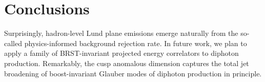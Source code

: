 \section{Conclusions}\label{sec:conclusions}

Surprisingly, hadron-level Lund plane emissions emerge naturally from
the so-called physics-informed background rejection rate. In future
work, we plan to apply a family of BRST-invariant projected energy
correlators to diphoton production. Remarkably, the cusp anomalous
dimension captures the total jet broadening of boost-invariant Glauber
modes of diphoton production in principle.


